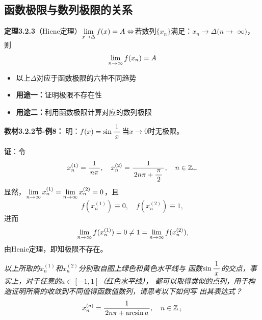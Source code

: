 \subsection{函数极限与数列极限的关系}

{\bf 定理3.2.3}（Hiene定理）$\lim\limits_{x\to{\Delta}}f(x)=A\Leftrightarrow
$若数列$\{x_n\}$满足：$x_n\to \Delta(n\to$ $\infty)$，则
$$\lim\limits_{n\to\infty} f(x_n)=A$$

\begin{itemize}
  \setlength{\itemindent}{1cm}
  \item 以上$\Delta$对应于函数极限的六种不同趋势 
  \item {\bf 用途一：}证明极限不存在性
  \item {\bf 用途二：}利用函数极限计算对应的数列极限
\end{itemize}

{\bf 教材3.2.2节-例8：}{\b 证明：$f(x)=\sin\displaystyle\frac{\,{1}\,}{\,{x}\,}$当$x\to 0$时无极限。}

{\bf 证}：令
$$x^{(1)}_n=\displaystyle\frac{\,{1}\,}{\,{n\pi}\,},\quad
x^{(2)}_n=\displaystyle\frac{\,{1}\,}{\,{2n\pi+\displaystyle\frac{\,{\pi}\,}{\,{2}\,}}\,},\quad n\in\mathbb{Z}_+$$ 
显然，$\lim\limits_{n\to\infty} x^{(1)}_n=\lim\limits_{n\to\infty} x^{(2)}_n=0$，且
$$f(x^{(1)}_n)\equiv0,\quad f(x^{(2)}_n)\equiv1,$$
进而
$$\lim\limits_{n\to\infty} f(x^{(1)}_n)=0\ne1=\lim\limits_{n\to\infty} f(x^{(2)}_n),$$
由Henie定理，即知极限不存在。

\begin{center}
	
	{\it 以上所取的$x^{(1)}_n$和$x^{(2)}_n$分别取自图上绿色和黄色水平线与
	函数$\sin\displaystyle\frac{\,{1}\,}{\,{x}\,}$的交点，事实上，对于任意的$a\in[-1,1]$（红色水平线），
	都可以取得类似的点列，用于构造证明所需的收敛到不同值得函数值数列，请思考以下如何写
	出其表达式？
	$$x^{(a)}_n=\displaystyle\frac{\,{1}\,}{\,{2n\pi+\arcsin a}\,},\quad n\in\mathbb{Z}_+$$}
\end{center}

